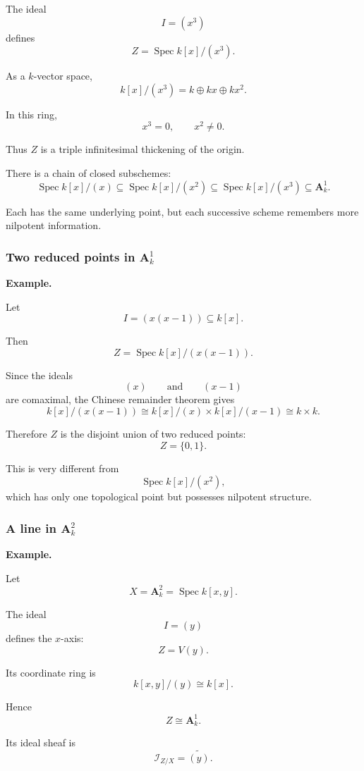 \documentclass[12pt,a4paper]{article}
\theoremstyle{notespace}
\begin{document}
The ideal
\[
I=(x^3)
\]
defines
\[
Z=\operatorname{Spec}k[x]/(x^3).
\]

As a \(k\)-vector space,
\[
k[x]/(x^3)
=
k\oplus kx\oplus kx^2.
\]

In this ring,
\[
x^3=0,
\qquad
x^2\neq0.
\]

Thus \(Z\) is a triple infinitesimal thickening of the origin.

There is a chain of closed subschemes:
\[
\operatorname{Spec}k[x]/(x)
\subseteq
\operatorname{Spec}k[x]/(x^2)
\subseteq
\operatorname{Spec}k[x]/(x^3)
\subseteq
\mathbf A^1_k.
\]

Each has the same underlying point, but each successive scheme remembers more nilpotent information.

\subsubsection{Two reduced points in \(\mathbf A^1_k\)}

\textbf{Example.}

Let
\[
I=(x(x-1))\subseteq k[x].
\]

Then
\[
Z=\operatorname{Spec}k[x]/(x(x-1)).
\]

Since the ideals
\[
(x)
\qquad\text{and}\qquad
(x-1)
\]
are comaximal, the Chinese remainder theorem gives
\[
k[x]/(x(x-1))
\cong
k[x]/(x)\times k[x]/(x-1)
\cong
k\times k.
\]

Therefore \(Z\) is the disjoint union of two reduced points:
\[
Z=\{0,1\}.
\]

This is very different from
\[
\operatorname{Spec}k[x]/(x^2),
\]
which has only one topological point but possesses nilpotent structure.

\subsubsection{A line in \(\mathbf A^2_k\)}

\textbf{Example.}

Let
\[
X=\mathbf A^2_k=\operatorname{Spec}k[x,y].
\]

The ideal
\[
I=(y)
\]
defines the \(x\)-axis:
\[
Z=V(y).
\]

Its coordinate ring is
\[
k[x,y]/(y)\cong k[x].
\]

Hence
\[
Z\cong\mathbf A^1_k.
\]

Its ideal sheaf is
\[
\mathcal I_{Z/X}=\widetilde{(y)}.
\]
\end{document}
